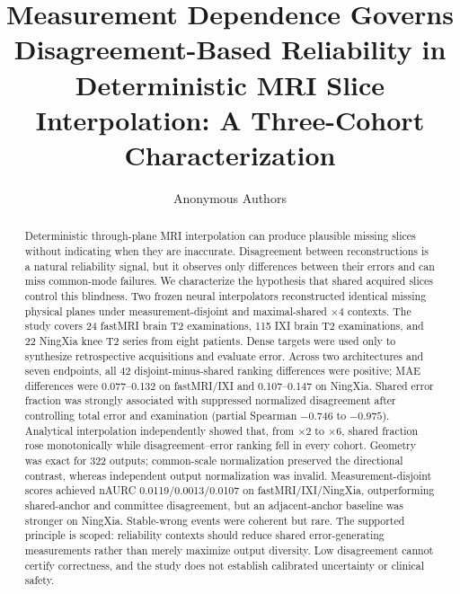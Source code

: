 \documentclass[journal,10pt]{IEEEtran}
\begin{document}
\title{Measurement Dependence Governs Disagreement-Based Reliability in Deterministic MRI Slice Interpolation: A Three-Cohort Characterization}
\author{Anonymous Authors%
}
\maketitle

\begin{abstract}
Deterministic through-plane MRI interpolation can produce plausible missing slices without indicating when they are inaccurate. Disagreement between reconstructions is a natural reliability signal, but it observes only differences between their errors and can miss common-mode failures. We characterize the hypothesis that shared acquired slices control this blindness. Two frozen neural interpolators reconstructed identical missing physical planes under measurement-disjoint and maximal-shared $\times4$ contexts. The study covers 24 fastMRI brain T2 examinations, 115 IXI brain T2 examinations, and 22 NingXia knee T2 series from eight patients. Dense targets were used only to synthesize retrospective acquisitions and evaluate error. Across two architectures and seven endpoints, all 42 disjoint-minus-shared ranking differences were positive; MAE differences were 0.077--0.132 on fastMRI/IXI and 0.107--0.147 on NingXia. Shared error fraction was strongly associated with suppressed normalized disagreement after controlling total error and examination (partial Spearman $-0.746$ to $-0.975$). Analytical interpolation independently showed that, from $\times2$ to $\times6$, shared fraction rose monotonically while disagreement--error ranking fell in every cohort. Geometry was exact for 322 outputs; common-scale normalization preserved the directional contrast, whereas independent output normalization was invalid. Measurement-disjoint scores achieved nAURC 0.0119/0.0013/0.0107 on fastMRI/IXI/NingXia, outperforming shared-anchor and committee disagreement, but an adjacent-anchor baseline was stronger on NingXia. Stable-wrong events were coherent but rare. The supported principle is scoped: reliability contexts should reduce shared error-generating measurements rather than merely maximize output diversity. Low disagreement cannot certify correctness, and the study does not establish calibrated uncertainty or clinical safety.
\end{abstract}
\end{document}
